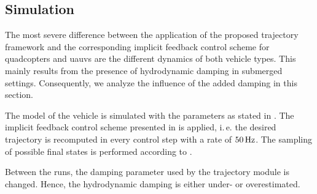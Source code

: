 \subsection{Simulation}
The most severe difference between the application of the proposed trajectory framework and the corresponding implicit feedback control scheme for quadcopters and \acp{uauv} are the different dynamics of both vehicle types. This mainly results from the presence of hydrodynamic damping in submerged settings. Consequently, we analyze the influence of the added damping in this section.

The model of the vehicle is simulated with the parameters as stated in . The implicit feedback control scheme presented in  is applied, i.\,e. the desired trajectory is recomputed in every control step with a rate of $\unit[50]{Hz}$. The sampling of possible final states is performed according to .

Between the runs, the damping parameter used by the trajectory module is changed. Hence, the hydrodynamic damping is either under- or overestimated.


